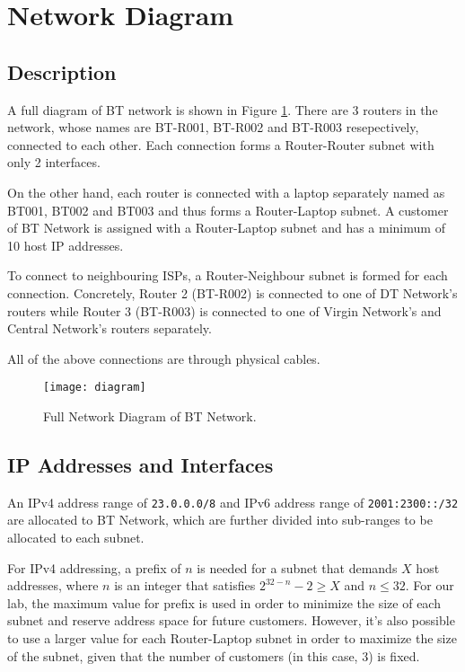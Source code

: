 \section{Network Diagram}
\label{sec:diagram}

\subsection{Description}

A full diagram of BT network is shown in Figure \ref{fig:diagram}.
There are 3 routers in the network, whose names are BT-R001, BT-R002 and BT-R003 resepectively, connected to each other. 
Each connection forms a Router-Router subnet with only 2 interfaces.

On the other hand, each router is connected with a laptop separately named as BT001, BT002 and BT003 and thus forms a Router-Laptop subnet.
A customer of BT Network is assigned with a Router-Laptop subnet and has a minimum of 10 host IP addresses.

To connect to neighbouring ISPs, a Router-Neighbour subnet is formed for each connection. Concretely, Router 2 (BT-R002) is connected to one of DT Network's routers while Router 3 (BT-R003) is connected to one of Virgin Network's and Central Network's routers separately.

All of the above connections are through physical cables.

\begin{landscape}
\begin{figure}[t!]
    \centering
    \texttt{[image: diagram]}
    \caption{Full Network Diagram of BT Network.}
    \label{fig:diagram}
\end{figure}
\end{landscape}




\subsection{IP Addresses and Interfaces}

An IPv4 address range of \texttt{23.0.0.0/8} and IPv6 address range of \texttt{2001:2300::/32} are allocated to BT Network, which are further divided into sub-ranges to be allocated to each subnet.

For IPv4 addressing, a prefix of $n$ is needed for a subnet that demands $X$ host addresses, where $n$ is an integer that satisfies $2^{32-n} - 2 \geq X$ and $n \leq 32$. For our lab, the maximum value for prefix is used in order to minimize the size of each subnet and reserve address space for future customers. However, it's also possible to use a larger value for each Router-Laptop subnet in order to maximize the size of the subnet, given that the number of customers (in this case, $3$) is fixed.

